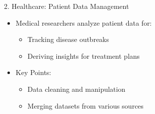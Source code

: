 \documentclass{beamer}
\begin{document}
\begin{frame}[fragile]
    \begin{block}{2. Healthcare: Patient Data Management}
        \begin{itemize}
            \item Medical researchers analyze patient data for:
            \begin{itemize}
                \item Tracking disease outbreaks
                \item Deriving insights for treatment plans
            \end{itemize}
            \item Key Points:
            \begin{itemize}
                \item Data cleaning and manipulation
                \item Merging datasets from various sources
            \end{itemize}
        \end{itemize}
    \end{block}
\end{frame}
\end{document}

